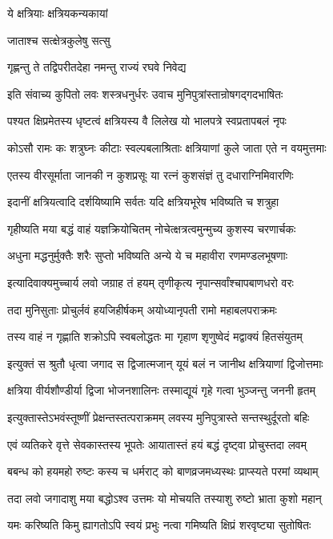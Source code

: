 ये क्षत्रियाः क्षत्रियकन्यकायां

जाताश्च सत्क्षेत्रकुलेषु सत्सु

\twolineshloka
{गृह्णन्तु ते तद्विपरीतदेहा}
{नमन्तु राज्यं रघवे निवेद्य}%

\twolineshloka
{इति संवाच्य कुपितो लवः शस्त्रधनुर्धरः}
{उवाच मुनिपुत्रांस्तान्रोषगद्गदभाषितः}%

\twolineshloka
{पश्यत क्षिप्रमेतस्य धृष्टत्वं क्षत्रियस्य वै}
{लिलेख यो भालपत्रे स्वप्रतापबलं नृपः}%

\twolineshloka
{कोऽसौ रामः कः शत्रुघ्नः कीटाः स्वल्पबलाश्रिताः}
{क्षत्रियाणां कुले जाता एते न वयमुत्तमाः}%

\twolineshloka
{एतस्य वीरसूर्माता जानकी न कुशप्रसूः}
{या रत्नं कुशसंज्ञं तु दधाराग्निमिवारणिः}%

\twolineshloka
{इदानीं क्षत्रियत्वादि दर्शयिष्यामि सर्वतः}
{यदि क्षत्रियभूरेष भविष्यति च शत्रुहा}%

\twolineshloka
{गृहीष्यति मया बद्धं वाहं यज्ञक्रियोचितम्}
{नोचेत्क्षत्रत्वमुन्मुच्य कुशस्य चरणार्चकः}%

\twolineshloka
{अधुना मद्धनुर्मुक्तैः शरैः सुप्तो भविष्यति}
{अन्ये ये च महावीरा रणमण्डलभूषणाः}%

\twolineshloka
{इत्यादिवाक्यमुच्चार्य लवो जग्राह तं हयम्}
{तृणीकृत्य नृपान्सर्वांश्चापबाणधरो वरः}%

\twolineshloka
{तदा मुनिसुताः प्रोचुर्लवं हयजिहीर्षकम्}
{अयोध्यानृपती रामो महाबलपराक्रमः}%

\twolineshloka
{तस्य वाहं न गृह्णाति शक्रोऽपि स्वबलोद्धतः}
{मा गृहाण शृणुष्वेदं मद्वाक्यं हितसंयुतम्}%

\twolineshloka
{इत्युक्तं स श्रुतौ धृत्वा जगाद स द्विजात्मजान्}
{यूयं बलं न जानीथ क्षत्रियाणां द्विजोत्तमाः}%

\twolineshloka
{क्षत्रिया वीर्यशौण्डीर्या द्विजा भोजनशालिनः}
{तस्माद्यूयं गृहे गत्वा भुञ्जन्तु जननी हृतम्}%

\twolineshloka
{इत्युक्तास्तेऽभवंस्तूष्णीं प्रेक्षन्तस्तत्पराक्रमम्}
{लवस्य मुनिपुत्रास्ते सन्तस्थुर्दूरतो बहिः}%

\twolineshloka
{एवं व्यतिकरे वृत्ते सेवकास्तस्य भूपतेः}
{आयातास्तं हयं बद्धं दृष्ट्वा प्रोचुस्तदा लवम्}%

\twolineshloka
{बबन्ध को हयमहो रुष्टः कस्य च धर्मराट्}
{को बाणव्रजमध्यस्थः प्राप्स्यते परमां व्यथाम्}%

\twolineshloka
{तदा लवो जगादाशु मया बद्धोऽश्व उत्तमः}
{यो मोचयति तस्याशु रुष्टो भ्राता कुशो महान्}%

\twolineshloka
{यमः करिष्यति किमु ह्यागतोऽपि स्वयं प्रभुः}
{नत्वा गमिष्यति क्षिप्रं शरवृष्ट्या सुतोषितः}%

